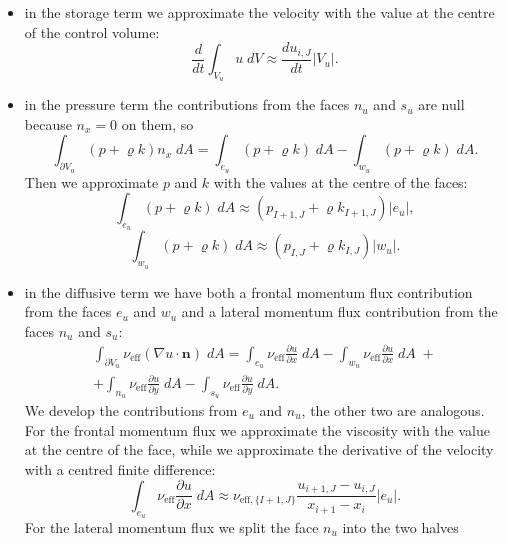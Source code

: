 \begin{itemize}
	\item in the storage term we approximate the velocity with the value at the 
	centre of the control volume:
	\begin{equation}
	\frac{d}{dt} \int_{V_u}  u\; dV \approx \frac{du_{i,J}}{dt}|V_u|.
	\end{equation}
	\item in the pressure term the contributions from the faces $n_u$ and $s_u$ 
	are null because $n_x=0$ on them, so 
	\begin{equation}
	\int_{\partial V_u} (p + \varrho k)n_x \; dA = \int_{e_u} (p+\varrho k) \; 
	dA - \int_{w_u} (p+\varrho k) \; dA.
	\end{equation}
	Then we approximate $p$ and $k$ with the values at the centre of the faces:
	\begin{equation}
	\int_{e_u} (p+\varrho k) \; dA \approx (p_{I+1,J} +\varrho k_{I+1,J}) |e_u|,
	\end{equation}
	\begin{equation}
	\int_{w_u} (p+\varrho k) \; dA \approx (p_{I,J} +\varrho k_{I,J}) |w_u|.
	\end{equation}
	\item in the diffusive term we have both a frontal momentum flux 
	contribution from the faces $e_u$ and $w_u$ and a lateral momentum flux 
	contribution from the faces $n_u$ and $s_u$:
	\begin{multline}
	\int_{\partial V_u} \nu_\text{eff} (\nabla u \cdot \mathbf{n}) \; dA =     
	\int_{e_u} \nu_\text{eff} \frac{\partial u}{\partial x} \; dA
	- \int_{w_u} \nu_\text{eff} \frac{\partial u}{\partial x} \; dA \;+\\
	+\int_{n_u} \nu_\text{eff} \frac{\partial u}{\partial y} \; dA
	- \int_{s_u} \nu_\text{eff} \frac{\partial u}{\partial y} \; dA.
	\end{multline}
	We develop the contributions from $e_u$ and $n_u$, the other two are 
	analogous.\\	
	For the frontal momentum flux we approximate the viscosity with 
	the value at the centre of the face, while we approximate the derivative of 
	the velocity with a centred finite difference:
	\begin{equation}
	\int_{e_u} \nu_\text{eff} \frac{\partial u}{\partial x} \; dA \approx 
	\nu_{\text{eff},\{I+1,J\}} \frac{u_{i+1,J} - u_{i,J}}{x_{i+1}-x_i} |e_u|.
	\end{equation}
	For the lateral momentum flux we split the 	face $n_u$ into the two halves 

\end{itemize}
